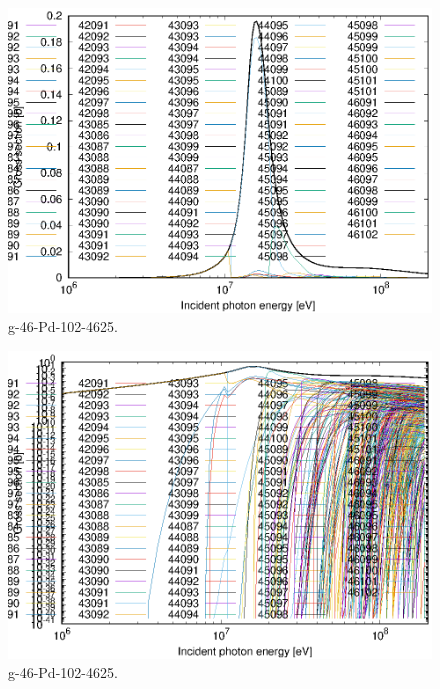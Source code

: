 \begin{figure}
 \includegraphics[width=\linewidth]{eps/g_46-Pd-102_4625.eps}
  \caption{g-46-Pd-102-4625.}
\end{figure}
\begin{figure}
 \includegraphics[width=\linewidth]{eps-log/g_46-Pd-102_4625.eps}
 \caption{g-46-Pd-102-4625.}
\end{figure}
\newpage \clearpage

